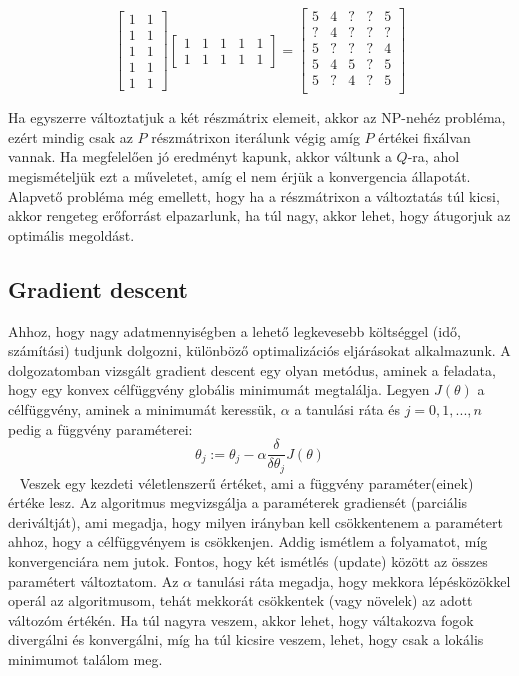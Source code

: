 \documentclass[a4paper,12pt]{article}
\begin{document}
\[
\begin{bmatrix}
    1 & 1 \\
    1 & 1  \\
    1 & 1  \\
    1 & 1  \\
    1 & 1          
\end{bmatrix}
%
\begin{bmatrix}
    1 & 1 & 1 & 1 & 1 \\
    1 & 1 & 1 & 1 & 1        
\end{bmatrix}
=
\begin{bmatrix}
    5 & 4 & ? & ? & 5\\
	? & 4 & ? & ? & ?\\
	5 & ? & ? & ? & 4\\
	5 & 4 & 5 & ? & 5\\
	5 & ? & 4 & ? & 5\\\end{bmatrix}
\]

Ha egyszerre változtatjuk a két részmátrix elemeit, akkor az NP-nehéz probléma, ezért mindig csak az $P$ részmátrixon iterálunk végig amíg $P$ értékei fixálvan vannak. Ha megfelelően jó eredményt kapunk, akkor váltunk a $Q$-ra, ahol megismételjük ezt a műveletet, amíg el nem érjük a konvergencia állapotát. Alapvető probléma még emellett, hogy ha a részmátrixon a változtatás túl kicsi, akkor rengeteg erőforrást elpazarlunk, ha túl nagy, akkor lehet, hogy átugorjuk az optimális megoldást.

\subsection{Gradient descent}

Ahhoz, hogy nagy adatmennyiségben a lehető legkevesebb költséggel (idő, számítási) tudjunk dolgozni, különböző optimalizációs eljárásokat alkalmazunk. A dolgozatomban vizsgált gradient descent egy olyan metódus, aminek a feladata, hogy egy konvex célfüggvény globális minimumát megtalálja. Legyen $J(\theta)$ a célfüggvény, aminek a minimumát keressük, $\alpha$ a tanulási ráta és $j=0, 1, ..., n$ pedig a függvény paraméterei:
\[\theta_j:=\theta_j-\alpha\frac{\delta}{\delta\theta_j}J(\theta)\]~\cite{andrewml}
Veszek egy kezdeti véletlenszerű értéket, ami a függvény paraméter(einek) értéke lesz. Az algoritmus megvizsgálja a paraméterek gradiensét (parciális deriváltját), ami megadja, hogy milyen irányban kell csökkentenem a paramétert ahhoz, hogy a célfüggvényem is csökkenjen. Addig ismétlem a folyamatot, míg konvergenciára nem jutok. Fontos, hogy két ismétlés (update) között az összes paramétert változtatom. \linebreak
Az $\alpha$ tanulási ráta megadja, hogy mekkora lépésközökkel operál az algoritmusom, tehát mekkorát csökkentek (vagy növelek) az adott változóm értékén. Ha túl nagyra veszem, akkor lehet, hogy váltakozva fogok divergálni és konvergálni, míg ha túl kicsire veszem, lehet, hogy csak a lokális minimumot találom meg.
\end{document}
